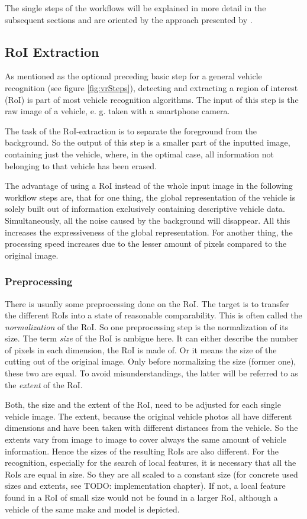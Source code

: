 The single steps of the workflows will be explained in more detail in the subsequent sections and are oriented by the approach presented by \citep{siddiqui2015robust}.

\subsection{RoI Extraction}\label{sec:roiExtraction}
As mentioned as the optional preceding basic step for a general vehicle recognition (see figure \ref{fig:vrSteps}), detecting and extracting a region of interest (RoI) is part of most vehicle recognition algorithms. The input of this step is the raw image of a vehicle, e. g. taken with a smartphone camera.

The task of the RoI-extraction is to separate the foreground from the background. So the output of this step is a smaller part of the inputted image, containing just the vehicle, where, in the optimal case, all information not belonging to that vehicle has been erased.

The advantage of using a RoI instead of the whole input image in the following workflow steps are, that for one thing, the global representation of the vehicle is solely built out of information exclusively containing descriptive vehicle data. Simultaneously, all the noise caused by the background will disappear. All this increases the expressiveness of the global representation. For another thing, the processing speed increases due to the lesser amount of pixels compared to the original image.

\subsubsection{Preprocessing}
There is usually some preprocessing done on the RoI. The target is to transfer the different RoIs into a state of reasonable comparability. This is often called the \emph{normalization} of the RoI. So one preprocessing step is the normalization of its size. The term \emph{size} of the RoI is ambigue here. It can either describe the number of pixels in each dimension, the RoI is made of. Or it means the size of the cutting out of the original image. Only before normalizing the size (former one), these two are equal. To avoid misunderstandings, the latter will be referred to as the \emph{extent} of the RoI.

Both, the size and the extent of the RoI, need to be adjusted for each single vehicle image. The extent, because the original vehicle photos all have different dimensions and have been taken with different distances from the vehicle. So the extents vary from image to image to cover always the same amount of vehicle information. Hence the sizes of the resulting RoIs are also different. For the recognition, especially for the search of local features, it is necessary that all the RoIs are equal in size. So they are all scaled to a constant size (for concrete used sizes and extents, see TODO: implementation chapter). If not, a local feature found in a RoI of small size would not be found in a larger RoI, although a vehicle of the same make and model is depicted.

